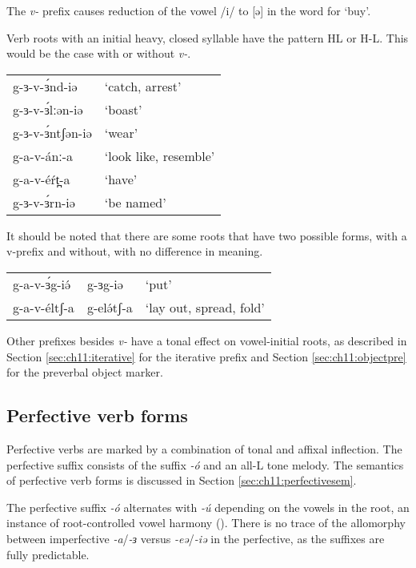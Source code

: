 The \textit{v-} prefix causes reduction of the vowel /i/ to [ə] in the word for ‘buy’.

Verb roots with an initial heavy, closed syllable have the pattern HL or H-L. This would be the case with or without \textit{v-}. 

\ea 
\begin{tabular}[t]{ll}
g-ɜ-v-ɜ́nd-iə		&	`catch, arrest'\\
g-ɜ-v-ɜ́lːən-iə		&	`boast'\\
g-ɜ-v-ɜ́ntʃən-iə		&	`wear'\\
g-a-v-ánː-a			&	`look like, resemble'\\
g-a-v-éŕt̪-a			&	`have'\\
g-ɜ-v-ɜ́rn-iə		&	`be named'\\ 	
\end{tabular}
\z 

It should be noted that there are some roots that have two possible forms, with a v-prefix and without, with no difference in meaning.

\ea 
\begin{tabular}[t]{lll}
g-a-v-ɜ́g-iə́		&	g-ɜg-iə		&	`put'\\
g-a-v-éltʃ-a	&	g-elə́tʃ-a	&	`lay out, spread, fold'\\	
\end{tabular}
\z 

Other prefixes besides \textit{v-} have a tonal effect on vowel-initial roots, as described in Section \ref{sec:ch11:iterative} for the iterative prefix and Section \ref{sec:ch11:objectpre} for the preverbal object marker. 

\subsection{Perfective verb forms}\label{sec:ch11:perfective}

Perfective verbs are marked by a combination of tonal and affixal inflection. The perfective suffix consists of the suffix \textit{-ó} and an all-L tone melody. The semantics of perfective verb forms is discussed in Section \ref{sec:ch11:perfectivesem}.

The perfective suffix \textit{-ó} alternates with \textit{-ú} depending on the vowels in the root, an instance of root-controlled vowel harmony (). There is no trace of the allomorphy between imperfective \textit{-a}/\textit{-ɜ} versus \textit{-eə}/\textit{-iə} in the perfective, as the suffixes are fully predictable.

